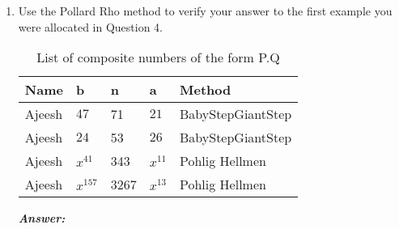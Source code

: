 \documentclass[11pt,a4paper,fleqn]{article}
\begin{document}
\begin{enumerate}[1.]
\begin{flushleft}
\begin{verbatim}
Step1:

x0 := 0;
x0 := 0

s := x^(11*49 mod 343);
h0 := x^(41*49 mod 343);
196
s := x   

294
h0 := x   

"Searching for d0; d0 = 5 satisfies s^(d0) = h0 "

NULL;
d0 := 5;
d0 := 5

x^(196*5 mod 343);
294
x   

NULL;
x1 := x0 + p^0*d0;
x1 := 5

Step 2:

h1 := x^((7*(-55 + 41)) mod 343);
245
h1 := x   

"Searching for d1; d1 = 3 satisfies s^(d1) = h1 "

NULL;
d1 := 3;
d1 := 3

x^(196*3 mod 343);
245
x   

NULL;
x2 := x1 + p^1*d1;
x2 := 26

Step 3:

h2 := x^((-286 + 41) mod 343);
98
h2 := x  

"Searching for d2; d2 = 4 satisfies s^(d2) = h2 "

NULL;
d2 := 4;
d2 := 4

x^(196*4 mod 343);
98
x  

NULL;
x3 := d2*p^2 + x2;
x3 := 222

"x3*is*our*logarithm"



		\end{verbatim}
				
		\end{flushleft}
		\item Use the Pollard Rho method to verify your answer to the first example you were allocated in Question 4. 
		
		\begin{table}[H]
			\begin{adjustbox}{scale=0.9,center}
				\begin{tabular}{ |p{2cm}|p{2cm}|p{2cm}|p{2cm}|p{4cm}| }
					\hline
					Name & b & n & a & Method \\
					\hline
					Ajeesh & $47$   & 71   & $21$   & BabyStepGiantStep \\
					Ajeesh & $24$   & 53   & $26$   & BabyStepGiantStep  \\
					Ajeesh & $x^{41}$ & 343  & $x^{11}$ & Pohlig Hellmen \\
					Ajeesh & $x^{157}$& 3267 & $x^{13}$ & Pohlig Hellmen  \\
					\hline
				\end{tabular}
			\end{adjustbox}
			\caption{List of composite numbers of the form P.Q}
			\label{table:composite-pq}
		\end{table}
		
		\begin{flushleft}
			\textbf{\textit{Answer:}}
		\end{flushleft}
	\end{enumerate}
	
\end{document}
